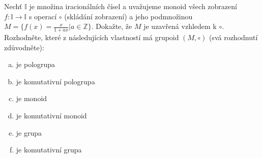 \subsubsection{}
Nechť $\mathbb{I}$ je množina iracionálních čísel a uvažujeme monoid všech
zobrazení $f: \mathbb{I} \rightarrow \mathbb{I}$ s operací $\circ$ (skládání
zobrazení) a jeho podmnožinou $M = \{f(x) = \frac{x}{1+ax} | a \in
\mathbb{Z}\}$.  Dokažte, že $M$ je uzavřená vzhledem k $\circ$.  Rozhodněte,
které z následujících vlastností má grupoid $(M, \circ)$ (svá rozhodnutí
zdůvodněte):
\begin{enumerate}[a)]
	\item je pologrupa
	\item je komutativní pologrupa
	\item je monoid
	\item je komutativní monoid
	\item je grupa
	\item je komutativní grupa
\end{enumerate}
